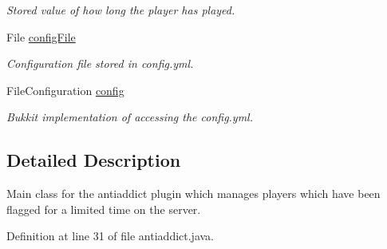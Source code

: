 \begin{DoxyCompactItemize}
\begin{DoxyCompactList}\small\item\em \-Stored value of how long the player has played. \end{DoxyCompactList}\item 
\hypertarget{classcom_1_1github_1_1zephyrz4_1_1antiaddict_1_1antiaddict_af9371dc0e20b3b0e7fae8fa22bb105a7}{\-File \hyperlink{classcom_1_1github_1_1zephyrz4_1_1antiaddict_1_1antiaddict_af9371dc0e20b3b0e7fae8fa22bb105a7}{config\-File}}\label{classcom_1_1github_1_1zephyrz4_1_1antiaddict_1_1antiaddict_af9371dc0e20b3b0e7fae8fa22bb105a7}

\begin{DoxyCompactList}\small\item\em \-Configuration file stored in config.\-yml. \end{DoxyCompactList}\item 
\hypertarget{classcom_1_1github_1_1zephyrz4_1_1antiaddict_1_1antiaddict_ac568eb182305e4cd38b10608d1b2cc54}{\-File\-Configuration \hyperlink{classcom_1_1github_1_1zephyrz4_1_1antiaddict_1_1antiaddict_ac568eb182305e4cd38b10608d1b2cc54}{config}}\label{classcom_1_1github_1_1zephyrz4_1_1antiaddict_1_1antiaddict_ac568eb182305e4cd38b10608d1b2cc54}

\begin{DoxyCompactList}\small\item\em \-Bukkit implementation of accessing the config.\-yml. \end{DoxyCompactList}\end{DoxyCompactItemize}


\subsection{\-Detailed \-Description}
\-Main class for the antiaddict plugin which manages players which have been flagged for a limited time on the server. 

\-Definition at line 31 of file antiaddict.\-java.



